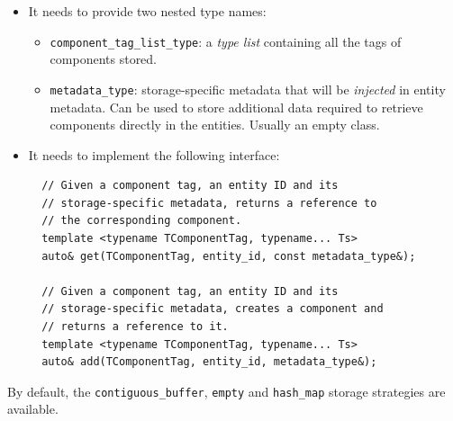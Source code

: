 \documentclass[twoside, 12pt, a4paper, openany]{book}
\begin{document}
\begin{itemize}
\item
  It needs to provide two nested type names:

  \begin{itemize}
  \item
    \texttt{component_tag_list_type}:
    a \emph{type list} containing all the tags of components stored.
  \item
    \texttt{metadata_type}:
    storage-specific metadata that will be \emph{injected} in entity
    metadata. Can be used to store additional data required to retrieve
    components directly in the entities. Usually an empty class.
  \end{itemize}
\item
  It needs to implement the following interface:

  \begin{verbatim}
  // Given a component tag, an entity ID and its
  // storage-specific metadata, returns a reference to
  // the corresponding component.
  template <typename TComponentTag, typename... Ts>
  auto& get(TComponentTag, entity_id, const metadata_type&);

  // Given a component tag, an entity ID and its
  // storage-specific metadata, creates a component and
  // returns a reference to it.
  template <typename TComponentTag, typename... Ts>
  auto& add(TComponentTag, entity_id, metadata_type&);
  \end{verbatim}
\end{itemize}

By default, the
\texttt{contiguous_buffer},
\texttt{empty}
and
\texttt{hash_map}
storage strategies are available.
\end{document}
